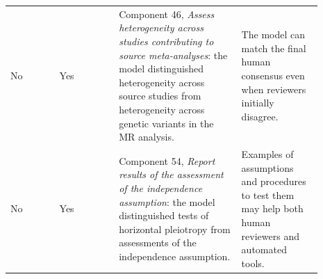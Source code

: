 \begin{longtable}{@{}p{0.14\linewidth}p{0.17\linewidth}p{0.35\linewidth}p{0.23\linewidth}@{}}
No & Yes &
Component 46, \textit{Assess heterogeneity across studies contributing to source meta-analyses}: the model distinguished heterogeneity across source studies from heterogeneity across genetic variants in the MR analysis. &
The model can match the final human consensus even when reviewers initially disagree. \\

No & Yes &
Component 54, \textit{Report results of the assessment of the independence assumption}: the model distinguished tests of horizontal pleiotropy from assessments of the independence assumption. &
Examples of assumptions and procedures to test them may help both human reviewers and automated tools. \\

\end{longtable}